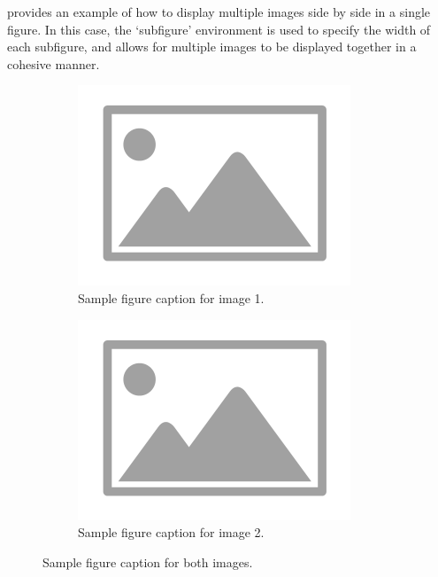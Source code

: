 \documentclass{article}
\begin{document}
 provides an example of how to display multiple images side by side in a single figure. In this case, the `subfigure' environment is used to specify the width of each subfigure, and allows for multiple images to be displayed together in a cohesive manner.

\begin{figure}[h]
  \centering
  \begin{subfigure}{0.45\textwidth}
    \includegraphics[width=0.9\linewidth]{images/placeholder-image.png}
    \caption{Sample figure caption for image 1.}
  \end{subfigure}
  \hfill
  \begin{subfigure}{0.45\textwidth}
    \includegraphics[width=0.9\linewidth]{images/placeholder-image.png}
    \caption{Sample figure caption for image 2.}
  \end{subfigure}
  \caption{Sample figure caption for both images.}
  \label{fig:example-2}
\end{figure}
\end{document}
